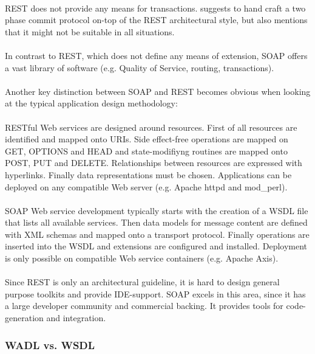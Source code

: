 \\
REST does not provide any means for transactions. \cite{RESTFULWEB} suggests to hand craft a two phase commit protocol on-top of the REST architectural style, but also mentions that it might not be suitable in all situations.
\\ \\
In contrast to REST, which does not define any means of extension, SOAP offers a vast library of software (e.g. Quality of Service, routing, transactions).
\\ \\
Another key distinction between SOAP and REST becomes obvious when looking at the typical application design methodology: 
\\ \\
RESTful Web services are designed around resources. First of all resources are identified and mapped onto URIs. Side effect-free operations are mapped on GET, OPTIONS and HEAD and state-modifiyng routines are mapped onto POST, PUT and DELETE. Relationships between resources are expressed with hyperlinks. Finally data representations must be chosen. Applications can be deployed on any compatible Web server (e.g. Apache httpd and mod\_perl). \cite{BIGREST}
\\ \\
SOAP Web service development typically starts with the creation of a WSDL file that lists all available services. Then data models for message content are defined with XML schemas and mapped onto a transport protocol. Finally operations are inserted into the WSDL and extensions are configured and installed. Deployment is only possible on compatible Web service containers (e.g. Apache Axis). \cite{BRINGBACKWEB}
\\ \\
Since REST is only an architectural guideline, it is hard to design general purpose toolkits and provide IDE-support. SOAP excels in this area, since it has a large developer community and commercial backing. It provides tools for code-generation and integration. 

\subsubsection{WADL vs. WSDL}

